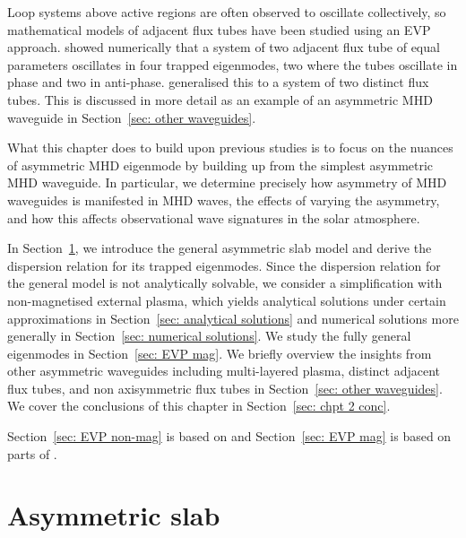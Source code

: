 \documentclass[12pt]{../style-files/ociamthesis}
\begin{document}
Loop systems above active regions are often observed to oscillate collectively, so mathematical models of adjacent flux tubes have been studied using an EVP approach. \cite{lun49} showed numerically that a system of two adjacent flux tube of equal parameters oscillates in four trapped eigenmodes, two where the tubes oscillate in phase and two in anti-phase. \cite{van_etal08c} generalised this to a system of two distinct flux tubes. This is discussed in more detail as an example of an asymmetric MHD waveguide in Section~\ref{sec: other waveguides}.

What this chapter does to build upon previous studies is to focus on the nuances of asymmetric MHD eigenmode by building up from the simplest asymmetric MHD waveguide. In particular, we determine precisely how asymmetry of MHD waveguides is manifested in MHD waves, the effects of varying the asymmetry, and how this affects observational wave signatures in the solar atmosphere.

In Section~\ref{sec: EVP asym slab}, we introduce the general asymmetric slab model and derive the dispersion relation for its trapped eigenmodes. Since the  dispersion relation for the general model is not analytically solvable, we consider a simplification with non-magnetised external plasma, which yields analytical solutions under certain approximations in Section~\ref{sec: analytical solutions} and numerical solutions more generally in Section~\ref{sec: numerical solutions}. We study the fully general eigenmodes in Section~\ref{sec: EVP mag}. We briefly overview the insights from other asymmetric waveguides including multi-layered plasma, distinct adjacent flux tubes, and non axisymmetric flux tubes in Section~\ref{sec: other waveguides}. We cover the conclusions of this chapter in Section~\ref{sec: chpt 2 conc}.

Section~\ref{sec: EVP non-mag} is based on \cite{all_etal17} and Section~\ref{sec: EVP mag} is based on parts of \cite{zsa_etal18}.

\section{Asymmetric slab}
\label{sec: EVP asym slab}
\end{document}

